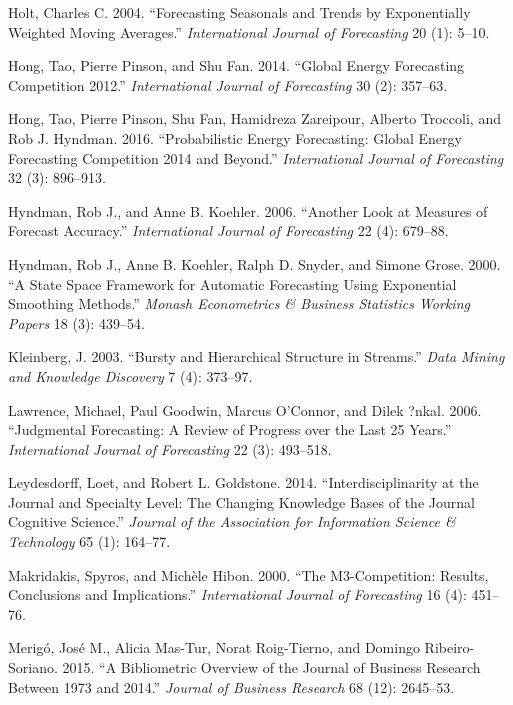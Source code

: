 \documentclass[11pt,a4paper]{elsarticle} %
\begin{document}
\hypertarget{ref-Holt2004}{}
Holt, Charles C. 2004. ``Forecasting Seasonals and Trends by
Exponentially Weighted Moving Averages.'' \emph{International Journal of
Forecasting} 20 (1): 5--10.

\hypertarget{ref-Hong2014}{}
Hong, Tao, Pierre Pinson, and Shu Fan. 2014. ``Global Energy Forecasting
Competition 2012.'' \emph{International Journal of Forecasting} 30 (2):
357--63.

\hypertarget{ref-Hong2016}{}
Hong, Tao, Pierre Pinson, Shu Fan, Hamidreza Zareipour, Alberto
Troccoli, and Rob J. Hyndman. 2016. ``Probabilistic Energy Forecasting:
Global Energy Forecasting Competition 2014 and Beyond.''
\emph{International Journal of Forecasting} 32 (3): 896--913.

\hypertarget{ref-Hyndman2006Another}{}
Hyndman, Rob J., and Anne B. Koehler. 2006. ``Another Look at Measures
of Forecast Accuracy.'' \emph{International Journal of Forecasting} 22
(4): 679--88.

\hypertarget{ref-Hyndman2000}{}
Hyndman, Rob J., Anne B. Koehler, Ralph D. Snyder, and Simone Grose.
2000. ``A State Space Framework for Automatic Forecasting Using
Exponential Smoothing Methods.'' \emph{Monash Econometrics \& Business
Statistics Working Papers} 18 (3): 439--54.

\hypertarget{ref-Kleinberg2003}{}
Kleinberg, J. 2003. ``Bursty and Hierarchical Structure in Streams.''
\emph{Data Mining and Knowledge Discovery} 7 (4): 373--97.

\hypertarget{ref-Lawrence2006Judgmental}{}
Lawrence, Michael, Paul Goodwin, Marcus O'Connor, and Dilek ?nkal. 2006.
``Judgmental Forecasting: A Review of Progress over the Last 25 Years.''
\emph{International Journal of Forecasting} 22 (3): 493--518.

\hypertarget{ref-Leydesdorff2014Interdisciplinarity}{}
Leydesdorff, Loet, and Robert L. Goldstone. 2014. ``Interdisciplinarity
at the Journal and Specialty Level: The Changing Knowledge Bases of the
Journal Cognitive Science.'' \emph{Journal of the Association for
Information Science \& Technology} 65 (1): 164--77.

\hypertarget{ref-Makridakis2000The}{}
Makridakis, Spyros, and Michèle Hibon. 2000. ``The M3-Competition:
Results, Conclusions and Implications.'' \emph{International Journal of
Forecasting} 16 (4): 451--76.

\hypertarget{ref-Meriguxf32015A}{}
Merigó, José M., Alicia Mas-Tur, Norat Roig-Tierno, and Domingo
Ribeiro-Soriano. 2015. ``A Bibliometric Overview of the Journal of
Business Research Between 1973 and 2014.'' \emph{Journal of Business
Research} 68 (12): 2645--53.
\end{document}
